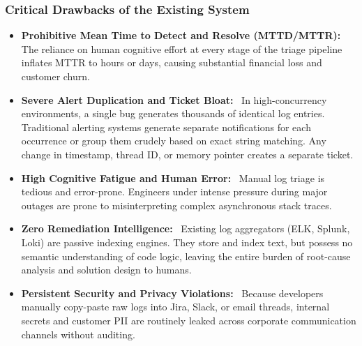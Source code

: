 \documentclass[12pt,a4paper]{article}
\newcommand{\lead}[1]{\textbf{#1}\ }
\begin{document}
\subsubsection{Critical Drawbacks of the Existing System}
\begin{itemize}[leftmargin=1.2em,itemsep=4pt]
    \item \lead{Prohibitive Mean Time to Detect and Resolve (MTTD/MTTR):} The reliance on human cognitive effort at every stage of the triage pipeline inflates MTTR to hours or days, causing substantial financial loss and customer churn.
    \item \lead{Severe Alert Duplication and Ticket Bloat:} In high-concurrency environments, a single bug generates thousands of identical log entries. Traditional alerting systems generate separate notifications for each occurrence or group them crudely based on exact string matching. Any change in timestamp, thread ID, or memory pointer creates a separate ticket.
    \item \lead{High Cognitive Fatigue and Human Error:} Manual log triage is tedious and error-prone. Engineers under intense pressure during major outages are prone to misinterpreting complex asynchronous stack traces.
    \item \lead{Zero Remediation Intelligence:} Existing log aggregators (ELK, Splunk, Loki) are passive indexing engines. They store and index text, but possess no semantic understanding of code logic, leaving the entire burden of root-cause analysis and solution design to humans.
    \item \lead{Persistent Security and Privacy Violations:} Because developers manually copy-paste raw logs into Jira, Slack, or email threads, internal secrets and customer PII are routinely leaked across corporate communication channels without auditing.
\end{itemize}
\end{document}
